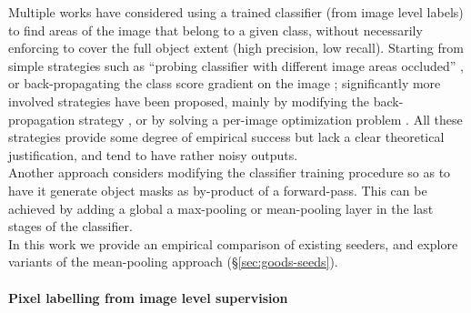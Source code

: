 \documentclass[british,10pt,twocolumn,letterpaper]{article}
\begin{document}
Multiple works have considered using a trained classifier (from image
level labels) to find areas of the image that belong to a given class,
without necessarily enforcing to cover the full object extent (high
precision, low recall). Starting from simple strategies such as ``probing
classifier with different image areas occluded'' \cite{Zeiler2014Eccv},
or back-propagating the class score gradient on the image \cite{Simonyan2014Iclr};
significantly more involved strategies have been proposed, mainly
by modifying the back-propagation strategy \cite{Springenberg2015Iclrw,Zhang2016Eccv,Shimoda2016Eccv},
or by solving a per-image optimization problem \cite{Cao2015Iccv}.
All these strategies provide some degree of empirical success but
lack a clear theoretical justification, and tend to have rather noisy
outputs.\\
Another approach considers modifying the classifier training procedure
so as to have it generate object masks as by-product of a forward-pass.
This can be achieved by adding a global a max-pooling \cite{Pinheiro2015Cvpr}
or mean-pooling layer \cite{zhou2015cnnlocalization} in the last
stages of the classifier.\\
In this work we provide an empirical comparison of existing seeders,
and explore variants of the mean-pooling approach \cite{zhou2015cnnlocalization}
(\S \ref{sec:goods-seeds}).

\paragraph{Pixel labelling from image level supervision}
\end{document}
